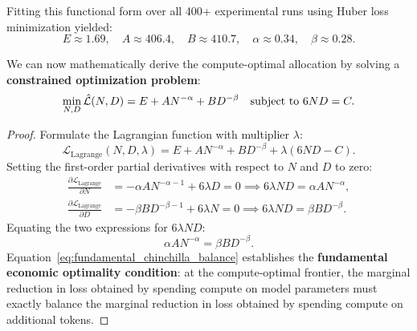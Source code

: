 \documentclass[../../main.tex]{subfiles}
\begin{document}
Fitting this functional form over all 400+ experimental runs using Huber loss minimization yielded:
\begin{equation}
\label{eq:chinchilla_fitted_parameters}
E \approx 1.69, \quad A \approx 406.4, \quad B \approx 410.7, \quad \alpha \approx 0.34, \quad \beta \approx 0.28.
\end{equation}

We can now mathematically derive the compute-optimal allocation by solving a \textbf{constrained optimization problem}:
\begin{equation}
\min_{N, D} \hat{\mathcal{L}}(N, D) = E + A N^{-\alpha} + B D^{-\beta} \quad \text{subject to } 6ND = C.
\end{equation}

\begin{proof}
Formulate the Lagrangian function with multiplier $\lambda$:
\begin{equation}
\label{eq:chinchilla_lagrangian}
\mathcal{L}_{\text{Lagrange}}(N, D, \lambda) = E + A N^{-\alpha} + B D^{-\beta} + \lambda (6ND - C).
\end{equation}
Setting the first-order partial derivatives with respect to $N$ and $D$ to zero:
\begin{align}
\label{eq:lagrange_deriv_n}
\frac{\partial \mathcal{L}_{\text{Lagrange}}}{\partial N} &= -\alpha A N^{-\alpha-1} + 6\lambda D = 0 \implies 6\lambda N D = \alpha A N^{-\alpha}, \\
\label{eq:lagrange_deriv_d}
\frac{\partial \mathcal{L}_{\text{Lagrange}}}{\partial D} &= -\beta B D^{-\beta-1} + 6\lambda N = 0 \implies 6\lambda N D = \beta B D^{-\beta}.
\end{align}
Equating the two expressions for $6\lambda N D$:
\begin{equation}
\label{eq:fundamental_chinchilla_balance}
\alpha A N^{-\alpha} = \beta B D^{-\beta}.
\end{equation}
Equation~\eqref{eq:fundamental_chinchilla_balance} establishes the \textbf{fundamental economic optimality condition}: at the compute-optimal frontier, the marginal reduction in loss obtained by spending compute on model parameters must exactly balance the marginal reduction in loss obtained by spending compute on additional tokens.


\end{proof}
\end{document}

